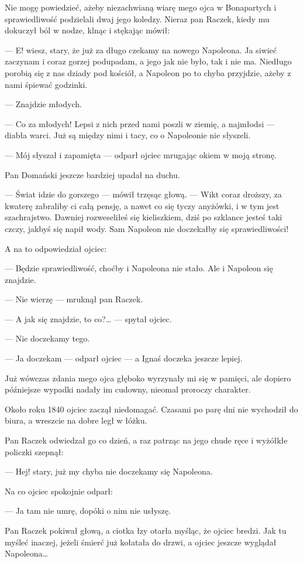 \documentclass{book}
\begin{document}
Nie mogę powiedzieć, ażeby niezachwianą wiarę mego ojca w Bonapartych i sprawiedliwość podzielali dwaj jego koledzy. Nieraz pan Raczek, kiedy mu dokuczył ból w nodze, klnąc i stękając mówił:

— E! wiesz, stary, że już za długo czekamy na nowego Napoleona. Ja siwieć zaczynam i coraz gorzej podupadam, a jego jak nie było, tak i nie ma. Niedługo porobią się z nas dziady pod kościół, a Napoleon po to chyba przyjdzie, ażeby z nami śpiewać godzinki.

— Znajdzie młodych.

— Co za młodych! Lepsi z nich przed nami poszli w ziemię, a najmłodsi — diabła warci. Już są między nimi i tacy, co o Napoleonie nie słyszeli.

— Mój słyszał i zapamięta — odparł ojciec mrugając okiem w moją stronę.

Pan Domański jeszcze bardziej upadał na duchu.

— Świat idzie do gorszego — mówił trzęsąc głową. — Wikt coraz droższy, za kwaterę zabraliby ci całą pensję, a nawet co się tyczy anyżówki, i w tym jest szachrajstwo. Dawniej rozweseliłeś się kieliszkiem, dziś po szklance jesteś taki czczy, jakbyś się napił wody. Sam Napoleon nie doczekałby się sprawiedliwości!

A na to odpowiedział ojciec:


— Będzie sprawiedliwość, choćby i Napoleona nie stało. Ale i Napoleon się znajdzie.

— Nie wierzę — mruknął pan Raczek.

— A jak się znajdzie, to co?… — spytał ojciec.

— Nie doczekamy tego.

— Ja doczekam — odparł ojciec — a Ignaś doczeka jeszcze lepiej.

Już wówczas zdania mego ojca głęboko wyrzynały mi się w pamięci, ale dopiero późniejsze wypadki nadały im cudowny, nieomal proroczy charakter.

Około roku 1840 ojciec zaczął niedomagać. Czasami po parę dni nie wychodził do biura, a wreszcie na dobre legł w łóżku.

Pan Raczek odwiedzał go co dzień, a raz patrząc na jego chude ręce i wyżółkłe policzki szepnął:

— Hej! stary, już my chyba nie doczekamy się Napoleona.

Na co ojciec spokojnie odparł:

— Ja tam nie umrę, dopóki o nim nie usłyszę.

Pan Raczek pokiwał głową, a ciotka łzy otarła myśląc, że ojciec bredzi. Jak tu myśleć inaczej, jeżeli śmierć już kołatała do drzwi, a ojciec jeszcze wyglądał Napoleona…
\end{document}
